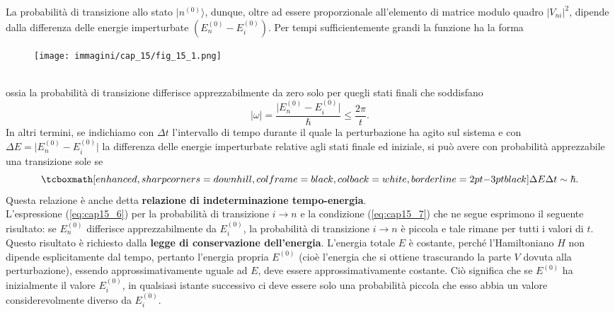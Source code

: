 La probabilità di transizione allo stato $\vert n ^{(0)} \rangle$, dunque, oltre ad essere proporzionale all'elemento di matrice modulo quadro $\vert V_{ni}\vert ^2$, dipende dalla differenza delle energie imperturbate $(E_n ^{(0)} - E_i ^{(0)}) $. Per tempi sufficientemente grandi la funzione ha la forma
\begin{figure}[!htbp]
\begin{center}
\texttt{[image: immagini/cap\_15/fig\_15\_1.png]}
\end{center}
\end{figure}\\
ossia la probabilità di transizione differisce apprezzabilmente da zero solo per quegli stati finali che soddisfano
\begin{equation}
\vert \omega \vert = \frac{\vert E_n ^{(0)} - E_i ^{(0)}\vert}{\hbar} \leq \frac{2\pi}{t}.
\end{equation}
In altri termini, se indichiamo con $\Delta t$ l'intervallo di tempo durante il quale la perturbazione ha agito sul sistema e con $\Delta E = \vert E_n ^{(0)} - E_i ^{(0)}\vert$ la differenza delle energie imperturbate relative agli stati finale ed iniziale, si può avere con probabilità apprezzabile una transizione sole se
	\begin{equation}
		\tcboxmath[enhanced, sharp corners=downhill, colframe=black, colback=white, borderline={2pt}{-3pt}{black}]{
			\Delta E \Delta t \sim \hbar .
			}
	\label{eq:cap15_7}
	\end{equation}
Questa relazione è anche detta \textbf{relazione di indeterminazione tempo-energia}.\\

L'espressione (\ref{eq:cap15_6}) per la probabilità di transizione $i\rightarrow n$ e la condizione (\ref{eq:cap15_7}) che ne segue esprimono il seguente risultato: se $E_n ^{(0)}$ differisce apprezzabilmente da   $E_i ^{(0)}$, la probabilità di transizione $i \rightarrow n$ è piccola e tale rimane per tutti i valori di $t$. Questo risultato è richiesto dalla  \textbf{legge di conservazione dell'energia}. L'energia totale $E$ è costante, perché l'Hamiltoniano $H$ non dipende esplicitamente dal tempo, pertanto l'energia propria $E^{(0)}$ (cioè l'energia che si ottiene trascurando la parte $V$ dovuta alla perturbazione), essendo approssimativamente uguale ad $E$, deve essere approssimativamente costante. Ciò significa che se $E^{(0)}$ ha inizialmente il valore $E _i ^{(0)}$, in qualsiasi istante successivo ci deve essere solo una probabilità piccola che esso abbia un valore considerevolmente diverso da $E _i ^{(0)}$.\\

